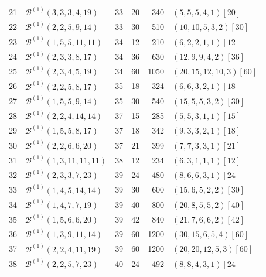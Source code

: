 \documentclass[11pt,a4paper]{article}
\newcommand{\Ber}{\mathcal B}
\theoremstyle{definition}
\theoremstyle{plain}
\begin{document}
\begin{longtable}{@{}r l r r r l@{}}
21 & $\Ber^{(1)}(3,3,3,4,19)$ & 33 & 20 & 340 & $(5,5,5,4,1)[20]$ \\
22 & $\Ber^{(1)}(2,2,5,9,14)$ & 33 & 30 & 510 & $(10,10,5,3,2)[30]$ \\
23 & $\Ber^{(1)}(1,5,5,11,11)$ & 34 & 12 & 210 & $(6,2,2,1,1)[12]$ \\
24 & $\Ber^{(1)}(2,3,3,8,17)$ & 34 & 36 & 630 & $(12,9,9,4,2)[36]$ \\
25 & $\Ber^{(1)}(2,3,4,5,19)$ & 34 & 60 & 1050 & $(20,15,12,10,3)[60]$ \\
26 & $\Ber^{(1)}(2,2,5,8,17)$ & 35 & 18 & 324 & $(6,6,3,2,1)[18]$ \\
27 & $\Ber^{(1)}(1,5,5,9,14)$ & 35 & 30 & 540 & $(15,5,5,3,2)[30]$ \\
28 & $\Ber^{(1)}(2,2,4,14,14)$ & 37 & 15 & 285 & $(5,5,3,1,1)[15]$ \\
29 & $\Ber^{(1)}(1,5,5,8,17)$ & 37 & 18 & 342 & $(9,3,3,2,1)[18]$ \\
30 & $\Ber^{(1)}(2,2,6,6,20)$ & 37 & 21 & 399 & $(7,7,3,3,1)[21]$ \\
31 & $\Ber^{(1)}(1,3,11,11,11)$ & 38 & 12 & 234 & $(6,3,1,1,1)[12]$ \\
32 & $\Ber^{(1)}(2,3,3,7,23)$ & 39 & 24 & 480 & $(8,6,6,3,1)[24]$ \\
33 & $\Ber^{(1)}(1,4,5,14,14)$ & 39 & 30 & 600 & $(15,6,5,2,2)[30]$ \\
34 & $\Ber^{(1)}(1,4,7,7,19)$ & 39 & 40 & 800 & $(20,8,5,5,2)[40]$ \\
35 & $\Ber^{(1)}(1,5,6,6,20)$ & 39 & 42 & 840 & $(21,7,6,6,2)[42]$ \\
36 & $\Ber^{(1)}(1,3,9,11,14)$ & 39 & 60 & 1200 & $(30,15,6,5,4)[60]$ \\
37 & $\Ber^{(1)}(2,2,4,11,19)$ & 39 & 60 & 1200 & $(20,20,12,5,3)[60]$ \\
38 & $\Ber^{(1)}(2,2,5,7,23)$ & 40 & 24 & 492 & $(8,8,4,3,1)[24]$ \\
\bottomrule
\end{longtable}
\end{document}

